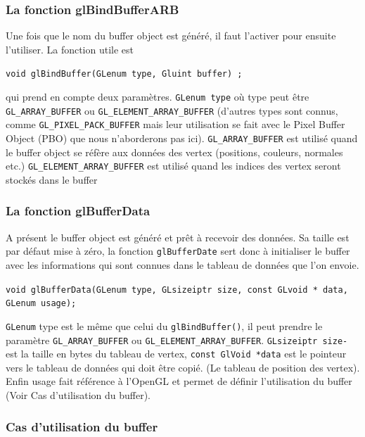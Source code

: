 \subsubsection*{La fonction glBindBufferARB}

Une fois que le nom du buffer object est généré, il faut l’activer pour ensuite l’utiliser. La fonction utile est 
\begin{center}
\verb|void glBindBuffer(GLenum type, Gluint buffer) ;|
\end{center}
qui prend en compte deux paramètres. \verb|GLenum type| où type peut être \verb|GL_ARRAY_BUFFER| ou \verb|GL_ELEMENT_ARRAY_BUFFER| (d’autres types sont connus, comme \verb|GL_PIXEL_PACK_BUFFER| mais leur utilisation se fait avec le Pixel Buffer Object (PBO) que nous n’aborderons pas ici). \verb|GL_ARRAY_BUFFER| est utilisé quand le buffer object se réfère aux données des vertex (positions, couleurs, normales etc.) \verb|GL_ELEMENT_ARRAY_BUFFER| est utilisé quand les indices des vertex seront stockés dans le buffer

\subsubsection*{La fonction glBufferData}

A présent le buffer object est généré et prêt à recevoir des données. Sa taille est par défaut mise à zéro, la fonction \verb|glBufferDate| sert donc à initialiser le buffer avec les informations qui sont connues dans le tableau de données que l’on envoie.
\begin{center}
\verb|void glBufferData(GLenum type, GLsizeiptr size, const GLvoid * data, |\\
\verb|GLenum usage);|
\end{center}
\verb|GLenum| type est le même que celui du \verb|glBindBuffer()|, il peut prendre le paramètre \verb|GL_ARRAY_BUFFER| ou \verb|GL_ELEMENT_ARRAY_BUFFER|. \verb|GLsizeiptr size-| est la taille en bytes du tableau de vertex, \verb|const GlVoid *data| est le pointeur vers le tableau de données qui doit être copié. (Le tableau de position des vertex). Enfin usage fait référence à l’OpenGL et permet de définir l’utilisation du buffer (Voir Cas d’utilisation du buffer).
\subsubsection{Cas d'utilisation du buffer}

